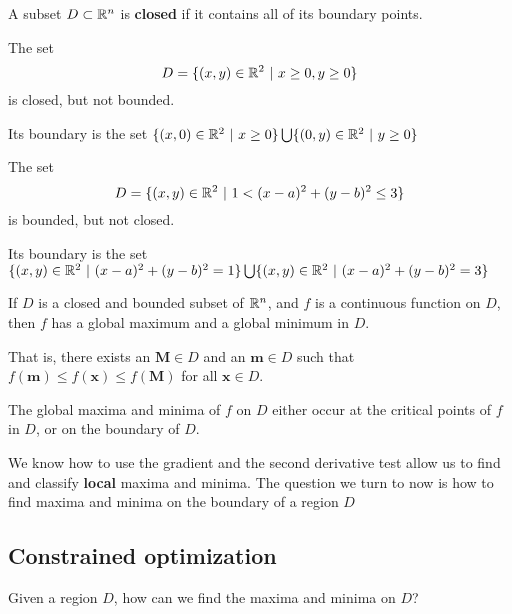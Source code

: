 \begin{definition}
    A subset $D \subset \mathbb{R}^n$ is \textbf{closed} if it contains all of its boundary points.
        
    \end{definition}

\begin{example}
    The set $$D = \{(x,y) \in \mathbb{R}^2 \ | \ x \geq 0, y \geq 0\}$$ is closed, but not bounded.
    
    Its boundary is the set $\{(x,0) \in \R^2 \ | \ x \geq 0\} \bigcup \{(0,y) \in \R^2 \ | \ y \geq 0\}$
\end{example}

\begin{example}
    The set $$D = \{(x,y) \in \mathbb{R}^2 \ | \ 1 < (x-a)^2 + (y-b)^2  \leq 3 \}$$ is bounded, but not closed.
    
    Its boundary is the set $\{(x,y) \in \R^2 \ | \  (x-a)^2 + (y-b)^2 =1 \} \bigcup \{(x,y) \in \R^2 \ | \ (x-a)^2 + (y-b)^2 = 3 \}$
\end{example}

\begin{theorem}
    If $D$ is a closed and bounded subset of $\mathbb{R}^n$, and $f$ is a continuous function on $D$, then $f$ 
    has a global maximum and a global minimum in $D$.
    
    \vspace{1em}
    
    That is, there exists an $\bm{M} \in D$ and an $\bm{m} \in D$ such that $f(\bm{m}) \leq f(\bm{x}) \leq f(\bm{M})$ for all $\bm{x} \in D$.
    \end{theorem}
    
    
    \begin{theorem}
    The global maxima and minima of $f$ on $D$ either occur at the critical points of $f$ in $D$, or on the boundary of $D$.
    \end{theorem}

    We know how to use the gradient and the second derivative test allow us to find and classify \textbf{local} maxima and minima.  The question we turn to now is how to find maxima and minima on the boundary of a region $D$

\subsection{Constrained optimization}

    \begin{motivating}
        Given a region $D$, how can we find the maxima and minima on $D$?
    \end{motivating}

